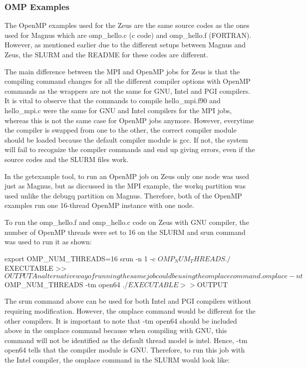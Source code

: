 \documentclass[journal]{IEEEtran}
\begin{document}
\subsubsection{OMP Examples}

The OpenMP examples used for the Zeus are the same source codes as the ones used for Magnus which are omp_hello.c (c code) and omp_hello.f (FORTRAN).
However, as mentioned earlier due to the different setups between Magnus and Zeus, the SLURM and the README for these codes are different.

The main difference between the MPI and OpenMP jobs for Zeus is that the compiling command changes for all the different compiler options with OpenMP
commands as the wrappers are not the same for GNU, Intel and PGI compilers. It is vital to observe that the commands to compile hello_mpi.f90 and
hello_mpi.c were the same for GNU and Intel compilers for the MPI jobs, whereas this is not the same case for OpenMP jobs anymore. However, everytime the
compiler is swapped from one to the other, the correct compiler module should be loaded because the default compiler module is gcc. If not, the system 
will fail to recognize the compiler commands and end up giving errors, even if the source codes and the SLURM files work.

In the getexample tool, to run an OpenMP job on Zeus only one node was used just as Magnus, but as diccussed in the MPI example, the workq partition was
used unlike the debugq partition on Magnus. Therefore, both of the OpenMP examples run one 16-thread OpenMP instance with one node.

To run the omp_hello.f and omp_hello.c code on Zeus with GNU compiler, the number of OpenMP threads were set to 16 on the SLURM and srun command was 
used to run it as shown:

export OMP_NUM_THREADS=16
srun -n 1 -c $OMP_NUM_THREADS ./$EXECUTABLE >> ${OUTPUT}

An alternative way of running the same job could be using the omplace command.

omplace -nt $OMP_NUM_THREADS -tm open64 ./$EXECUTABLE >> ${OUTPUT}

The srun command above can be used for both Intel and PGI compilers without requiring modification. However, the omplace command would be different for
the other compilers. It is important to note that -tm open64 should be included above in the omplace command because when compiling with GNU, this 
command will not be identified as the default thread model is intel. Hence, -tm open64 tells that the compiler module is GNU. Therefore, to run this job
with the Intel compiler, the omplace command in the SLURM would look like:
\end{document}
